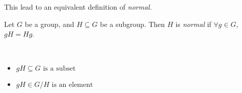 This lead to an equivalent definition of \textit{normal}.
\begin{definition}[Normal]
Let $G$ be a group, and $H \subseteq G$ be a subgroup. Then $H$ is \textit{normal} if $\forall g \in G$, $gH = Hg$.
\end{definition}

\begin{note} ~
    \begin{itemize}
        \item $gH \subseteq G \text{ is a subset}$
        \item $gH \in G/H \text{ is an element}$
    \end{itemize}
\end{note}